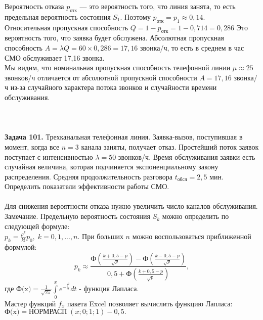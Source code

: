 \documentclass{article}
\begin{document}
Вероятность отказа $p_{\text{отк}
}$ — это вероятность того, что линия занята, то есть предельная вероятность состояния $S_1$. Поэтому $p_{\text{отк}} = p_1 \approx 0,14.$ \\ \indent 
Относительная пропускная способность $Q = 1 - p_{\text{отк}} = 1 - 0,714 = 0,286$ Это вероятность того, что заявка будет обслужена. Абсолютная  пропускная  способность $A = \lambda Q = 60\times0,286 = 17,16$ звонка/ч, то есть в среднем в час СМО обслуживает 17,16 звонка. \\ \indent Мы видим,  что номинальная  пропускная способность телефонной линии $\mu \approx 25$ звонков/ч отличается от абсолютной пропускной способности $A  =  17,16$  звонка/ч  из-за  случайного  характера  потока звонков и случайности времени обслуживания. \\ \\
\indent \; \; \; 
\\ \\ 
\indent \textbf{Задача 101.} 
Трехканальная телефонная линия.  Заявка-вызов, поступившая в момент, когда все $n = 3$ канала заняты, получает отказ. Простейший поток заявок поступает с интенсивностью $\lambda = 50$ звонков/ч. Время обслуживания заявки есть случайная величина, которая подчиняется  экспоненциальному  закону  распределения.  Средняя продолжительность разговора $t_{\text{обсл}} = 2,5$ мин. Определить показатели эффективности работы СМО. \\ \\ 
\noindent
Для  снижения  вероятности отказа  нужно увеличить число  каналов обслуживания. 
\\ \indent
Замечание.  Предельную вероятность состояния $S_k$ можно определить по следующей формуле: \\  $p_k = \frac{\rho^k}{k!}p_0, \; k=0, 1, ..., n$. При больших $n$ можно воспользоваться приближенной формулой: 
\[
p_k \approx \frac{\text{Ф}\left(\frac{k + 0,5 - p}{\sqrt{p}} \right) - \text{Ф}\left(\frac{k - 0,5 - p}{\sqrt{p}} \right)}{0,5 + \text{Ф}\left(\frac{k + 0,5 - p}{\sqrt{p}} \right)},
\]
где $\text{Ф(x)} = \frac{1}{\sqrt{2\pi}} \int\limits_0^x e^{-\frac{t^2}{2}}dt$ - функция Лапласа. \\ 
\indent Мастер функций $f_x$ пакета  Excel  позволяет  вычислить функцию Лапласа:\\
$\text{Ф(x)} = \text{НОРМРАСП} \; (x; 0; 1; 1) - 0,5.$
\end{document}
